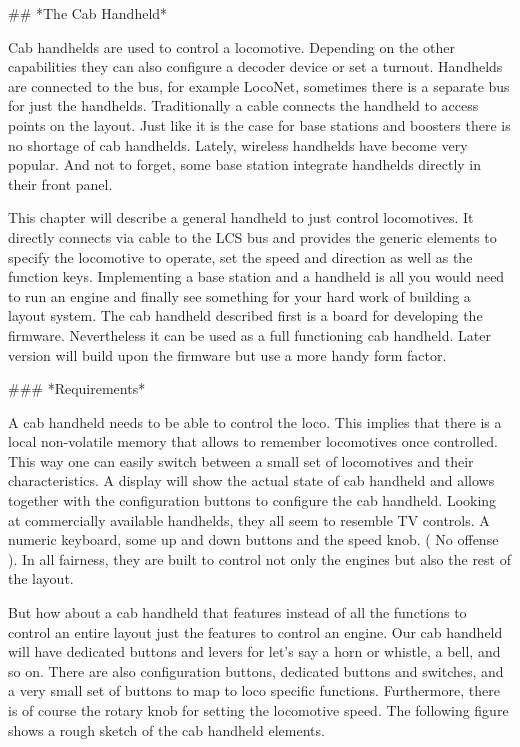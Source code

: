 ## *The Cab Handheld*

Cab handhelds are used to control a locomotive. Depending on the other capabilities they can also configure a decoder device or set a turnout. Handhelds are connected to the bus, for example LocoNet, sometimes there is a separate bus for just the handhelds. Traditionally a cable connects the handheld to access points on the layout. Just like it is the case for base stations and boosters there is no shortage of cab handhelds. Lately, wireless handhelds have become very popular. And not to forget, some base station integrate handhelds directly in their front panel.

This chapter will describe a general handheld to just control locomotives. It directly connects via cable to the LCS bus and provides the generic elements to specify the locomotive to operate, set the speed and direction as well as the function keys. Implementing a base station and a handheld is all you would need to run an engine and finally see something for your hard work of building a layout system. The cab handheld described first is a board for developing the firmware. Nevertheless it can be used as a full functioning cab handheld. Later version will build upon the firmware but use a more handy form factor.

### *Requirements*

A cab handheld needs to be able to control the loco. This implies that there is a local non-volatile memory that allows to remember locomotives once controlled. This way one can easily switch between a small set of locomotives and their characteristics. A display will show the actual state of cab handheld and allows together with the configuration buttons to configure the cab handheld. Looking at commercially available handhelds, they all seem to resemble TV controls. A numeric keyboard, some up and down buttons and the speed knob. ( No offense ). In all fairness, they are built to control not only the engines but also the rest of the layout.

But how about a cab handheld that features instead of all the functions to control an entire layout just the features to control an engine. Our cab handheld will have dedicated buttons and levers for let's say a horn or whistle, a bell, and so on. There are also configuration buttons, dedicated buttons and switches, and a very small set of buttons to map to loco specific functions. Furthermore, there is of course the rotary knob for setting the locomotive speed. The following figure shows a rough sketch of the cab handheld elements.


